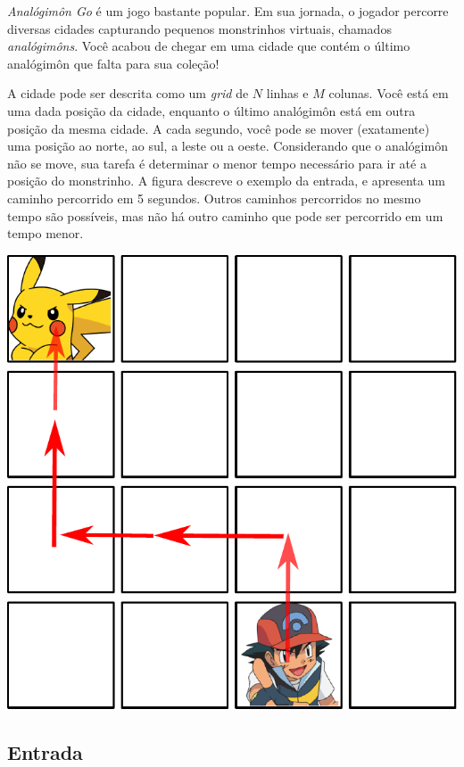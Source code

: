 \textit{Analógimôn Go} é um jogo bastante popular. Em sua jornada, o jogador percorre diversas
cidades capturando pequenos monstrinhos virtuais, chamados \textit{analógimôns}.
Você acabou de chegar em uma cidade que contém o último analógimôn que falta
para sua coleção!

A cidade pode ser descrita como um \textit{grid} de $N$ linhas e $M$ colunas.
Você está em uma dada posição da cidade, enquanto o último analógimôn está em
outra posição da mesma cidade. A cada segundo, você pode se mover (exatamente) uma
posição ao norte, ao sul, a leste ou a oeste. Considerando que o analógimôn não
se move, sua tarefa é determinar o menor tempo necessário para
ir até a posição do monstrinho.
A figura descreve o exemplo da
entrada, e apresenta um caminho percorrido em 5 segundos. Outros caminhos
percorridos no mesmo tempo são possíveis, mas não há outro caminho que pode ser
percorrido em um tempo menor.

\begin{center}
\includegraphics[scale=0.4]{ultimo/ultimo.pdf}
\end{center}

\subsection*{Entrada}

